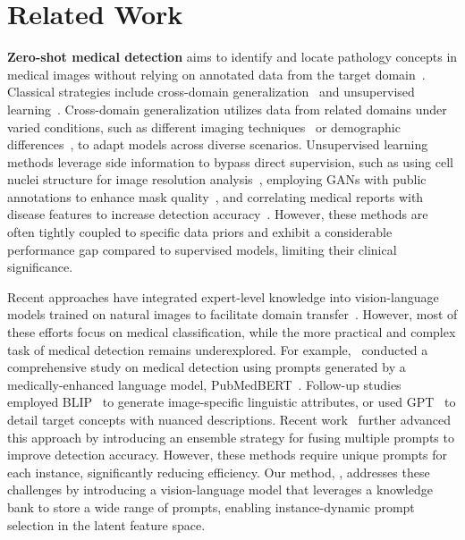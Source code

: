 \section{Related Work}
\textbf{Zero-shot medical detection} aims to identify and locate pathology concepts in medical images without relying on annotated data from the target domain~\citep{vilouras2024zero, qin2023medical, paul2021generalized, mahapatra2021medical, 2020ssns, 2022SOP}. Classical strategies include cross-domain generalization~\citep{adaptzero,capellan2024zero} and unsupervised learning~\citep{2020ssns,2022SOP,paul2021generalized}. Cross-domain generalization utilizes data from related domains under varied conditions, such as different imaging techniques~\citep{adaptzero} or demographic differences~\citep{capellan2024zero}, to adapt models across diverse scenarios. Unsupervised learning methods leverage side information to bypass direct supervision, such as using cell nuclei structure for image resolution analysis~\citep{2020ssns}, employing GANs with public annotations to enhance mask quality~\citep{2022SOP}, and correlating medical reports with disease features to increase detection accuracy~\citep{paul2021generalized}. However, these methods are often tightly coupled to specific data priors and exhibit a considerable performance gap compared to supervised models, limiting their clinical significance.

Recent approaches have integrated expert-level knowledge into vision-language models trained on natural images to facilitate domain transfer~\citep{liuchatgpt, lai2024carzero, tiu2022expert, wu2023medklip, zhang2023knowledge}. However, most of these efforts focus on medical classification, while the more practical and complex task of medical detection remains underexplored. For example,~\citep{qin2023medical} conducted a comprehensive study on medical detection using prompts generated by a medically-enhanced language model, PubMedBERT~\citep{gu2021domain}. Follow-up studies~\citep{wu2023zero, lu2023visual, phan2024decomposing} employed BLIP~\citep{li2022blip} to generate image-specific linguistic attributes, or used GPT~\citep{achiam2023gpt} to detail target concepts with nuanced descriptions. Recent work~\citep{guo2023multiple} further advanced this approach by introducing an ensemble strategy for fusing multiple prompts to improve detection accuracy. However, these methods require unique prompts for each instance, significantly reducing efficiency. Our method, \ours, addresses these challenges by introducing a vision-language model that leverages a knowledge bank to store a wide range of prompts, enabling instance-dynamic prompt selection in the latent feature space.




